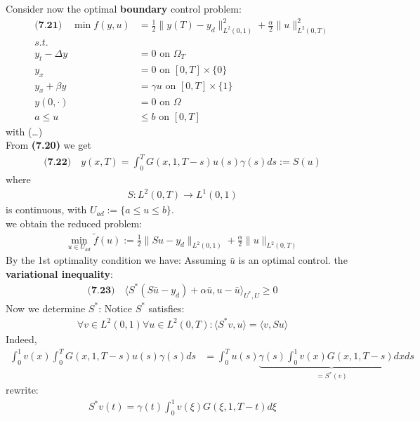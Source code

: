 Consider now the optimal \textbf{boundary} control problem:
\begin{align*}
	\textbf{(7.21)} \quad
	\min f(y, u) &= \frac{1}{2}\|y(T) - y_d\|_{L^2(0, 1)}^2 + \frac{\alpha}{2}\|u\|_{L^2(0, T)}^2\\
	s.t.\\
	y_t - \Delta y &= 0 \text{ on } \Omega_T\\
	y_x &= 0 \text{ on } [0, T] \times \{0 \}\\
	y_x + \beta y &= \gamma u \text{ on } [0, T] \times \{1\}\\
	y(0, \cdot) &= 0 \text{ on } \Omega	\\
	a \le u &\le b \text{ on } [0, T]
\end{align*}
with (\dots)\\
From \textbf{(7.20)} we get
\begin{align*}
	\textbf{(7.22)}\quad
	y(x, T)= \int_0^T G(x, 1, T-s) u(s) \gamma(s) ds := S(u)
\end{align*}
where
\begin{align*}
	S: L^2(0, T) \rightarrow L^1(0, 1)
\end{align*}
is continuous, with $U_{ad}:= \{ a \le u \le b\}$.  \\
we obtain the reduced problem:
\begin{align*}
	\min_{u \in U_{ad}} \tilde{f}(u):= \frac{1}{2}\|Su - y_d\|_{L^2(0, 1)} + \frac{\alpha}{2}\|u\|_{L^2(0, T)}
\end{align*}
By the 1st optimality condition we have: Assuming $\bar{u}$ is an optimal control. the \textbf{variational inequality}:
\begin{align*}
	\textbf{(7.23)}\quad
	\langle S^*(S\bar{u} - y_d) + \alpha \bar{u}, u - \bar{u} \rangle_{U^*, U}  \ge 0
\end{align*}
Now we determine $S^*$: Notice $S^*$ satisfies:
\begin{align*}
	\forall v \in L^2(0, 1) \forall u \in L^2(0, T): \langle S^* v , u\rangle = \langle v, Su \rangle 
\end{align*}
Indeed,
\begin{align*}
	\int_0^1 v(x) \int_0^T G(x, 1, T - s)u(s) \gamma(s) ds &= 
	\int_0^T u(s) \underbrace{\gamma(s) \int_0^1 v(x) G(x, 1, T - s) dx}_{ = S^*(v)} ds
\end{align*}
rewrite:
\begin{align*}
	S^*v(t) = \gamma(t) \int_0^1 v(\xi) G(\xi, 1, T - t)d\xi
\end{align*}

